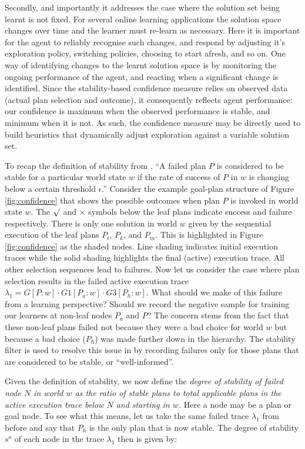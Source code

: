 {Secondly, and importantly it addresses the case where the solution set being learnt is not fixed. For several online learning applications the solution space changes over time and the learner must re-learn as necessary. Here it is important for the agent to reliably recognise such changes, and respond by adjusting it's exploration policy, switching policies, choosing to start afresh, and so on. One way of identifying changes to the learnt solution space is by monitoring the ongoing performance of the agent, and reacting when a significant change is identified. Since the stability-based confidence measure relies on observed data (actual plan selection and outcome), it consequently reflects agent performance: our confidence is maximum when the observed performance is stable, and minimum when it is not. As such, the confidence measure may be directly used to build heuristics that dynamically adjust exploration against a variable solution set.}

To recap the definition of stability from \cite{singh10:learning}, ``A failed plan $P$ is considered to be stable for a particular world state $w$ if the rate of success of $P$ in $w$ is changing below a certain threshold $\epsilon$.'' Consider the example goal-plan structure of Figure \ref{fig:confidence} that shows the possible outcomes when plan $P$ is invoked in world state $w$. The $\surd$ and $\times$ symbols below the leaf plans indicate success and failure respectively. There is only one solution in world $w$ given by the sequential execution of the leaf plans $P_i$, $P_k$, and $P_m$. This is highlighted in Figure \ref{fig:confidence} as the shaded nodes. Line shading indicates initial execution traces while the solid shading highlights the final (active) execution trace. All other selection sequences lead to failures. Now let us consider the case where plan selection results in the failed active execution trace $\lambda_1=G[P:w] \cdot G1[P_a:w] \cdot G3[P_h:w]$. What should we make of this failure from a learning perspective? Should we record the negative sample for training our learners at non-leaf nodes $P_a$ and $P$? The concern stems from the fact that these non-leaf plans failed not because they were a bad choice for world $w$ but because a bad choice ($P_h$) was made further down in the hierarchy. The stability filter is used to resolve this issue in \cite{singh10:learning} by recording failures only for those plans that are considered to be stable, or ``well-informed''. 

Given the definition of stability, we now define the {\em degree of stability of failed node $N$ in world $w$ as the ratio of stable plans to total applicable plans in the active execution trace below $N$ and starting in $w$.} Here a node may be a plan or goal node. To see what this means, let us take the same failed trace $\lambda_1$ from before and say that $P_h$ is the only plan that is now stable. The degree of stability $s^o$ of each node in the trace $\lambda_1$ then is given by:

